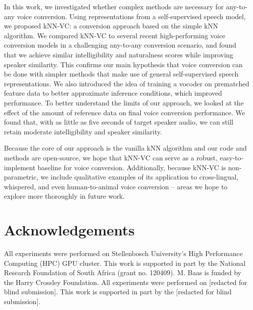 \documentclass{INTERSPEECH2023}
\def\modelname{{kNN-VC}}
\begin{document}
In this work, we investigated whether complex methods are necessary 
for any-to-any
voice conversion. Using representations from a self-supervised speech model, we 
proposed
\modelname{}: a conversion approach based on the simple kNN algorithm. 
We compared \modelname{} to several recent high-performing voice conversion models in a challenging any-to-any conversion scenario, 
and found
that we achieve similar intelligibility and naturalness scores while improving speaker similarity.
This confirms our main hypothesis that voice conversion can be done with simpler methods that make use of general self-supervised speech representations. We also introduced the idea of training a vocoder on prematched feature data to better approximate inference conditions, which improved performance.
To better understand the limits of our approach, we 
looked at the effect of the amount of
reference data on final voice conversion performance.
We found that, with as little as five seconds of target speaker audio, we can still retain moderate intelligibility and speaker similarity.

Because the core of our approach is the vanilla kNN algorithm and our code and methods are open-source,
we hope that \modelname{} can serve as a robust, easy-to-implement baseline for voice conversion.
Additionally, because \modelname{} is non-parametric, we include qualitative examples of its application to cross-lingual, whispered, and even human-to-animal voice conversion -- areas we hope to explore more thoroughly in future work.



\section{Acknowledgements}

\ifinterspeechfinal
All experiments were performed on Stellenbosch University’s High Performance Computing (HPC) GPU cluster. This work is supported in part by the National Research Foundation of South Africa (grant no. 120409).
M. Baas is funded by the Harry Crossley Foundation.
\else
All experiments were performed on [redacted for blind submission]. This work is supported in part by the [redacted for blind submission].
\fi


\newpage



\end{document}
